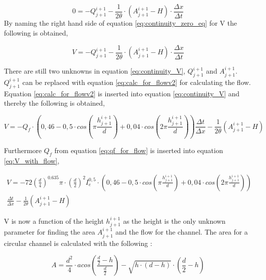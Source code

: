 \begin{equation}\label{eq:continuity_zero_eq}
        0=-Q_{j+1}^{i+1}  - \frac{1}{2\theta}\cdot\left(A_{j+1}^{i+1}-H\right)\cdot \frac{\Delta x}{\Delta t}
\end{equation}
By naming the right hand side of equation \ref{eq:continuity_zero_eq} for V the following is obtained,

\begin{equation}\label{eq:continuity_V}
        V=-Q_{j+1}^{i+1}  - \frac{1}{2\theta}\cdot\left(A_{j+1}^{i+1}-H\right)\cdot \frac{\Delta x}{\Delta t}
\end{equation}

There are still two unknowns in equation \ref{eq:continuity_V}, $Q_{j+1}^{i+1}$ and $A_{j+1}^{i+1}$. $Q_{j+1}^{i+1}$ can be replaced with equation \ref{eq:calc_for_flowv2} for calculating the flow. Equation \ref{eq:calc_for_flowv2} is inserted into equation \ref{eq:continuity_V} and thereby the following is obtained,

\begin{equation}\label{eq:V_with_flow}
    V = -Q_f\cdot\left(0,46-0,5\cdot cos\left(\pi \frac{h_{j+1}^{i+1}}{d}\right)+0,04\cdot cos\left(2\pi\frac{h_{j+1}^{i+1}}{d}\right)\right)\frac{\Delta t}{\Delta x}-\frac{1}{2\theta}\left(A_{j+1}^{i+1}-H\right)
\end{equation}

Furthermore $Q_f$ from equation \ref{eq:qf_for_flow} is inserted into equation \ref{eq:V_with_flow},

\begin{multline}\label{eq:new_continuity_equation}
    V = -72\left(\frac{d}{4}\right)^{0.635}\pi\cdot\left(\frac{d}{2}\right)^2I_e^{0,5}\cdot \left(0,46-0,5\cdot cos\left(\pi \frac{h_{j+1}^{i+1}}{d}\right)+ 0,04\cdot cos\left(2\pi\frac{h_{j+1}^{i+1}}{d}\right)\right)\\ \frac{\Delta t}{\Delta x}-\frac{1}{2\theta}\left(A_{j+1}^{i+1}-H\right)
\end{multline}

V is now a function of the height $h_{j+1}^{i+1}$ as the height is the only unknown parameter for finding the area $A_{j+1}^{i+1}$ and the flow for the channel. The area for a circular channel is calculated with the following \cite{ikke_stationear}:

\begin{equation}\label{eq:calc_area_open_channel}
    A = \frac {d^2}{4} \cdot acos \left(\frac{\frac{d}{2}-h}{\frac{d}{2}}\right)-\sqrt{h\cdot (d-h)}\cdot  \left(\frac{d}{2}-h\right)
\end{equation}

